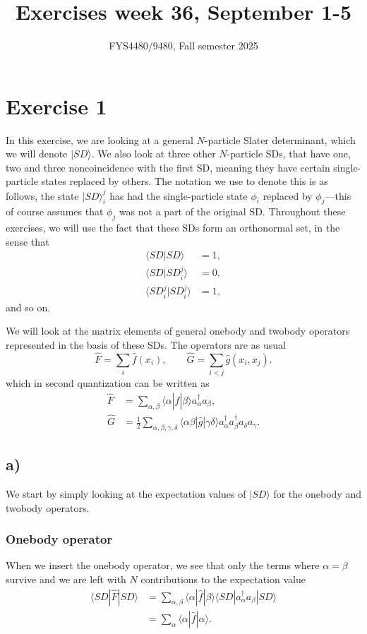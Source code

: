 \documentclass[a4paper, 11pt, notitlepage, english]{article}
\title{Exercises week 36, September 1-5}
\author{FYS4480/9480, Fall semester 2025}
\newcommand{\ket}[1]{|#1 \rangle}
\newcommand{\braket}[2]{\langle #1 | #2 \rangle}
\newcommand{\op}[1]{\hat{#1}}
\newcommand{\braopket}[3]{\langle #1 | {#2} | #3 \rangle}
\begin{document}
\maketitle

\section*{Exercise 1}
In this exercise, we are looking at a general $N$-particle Slater determinant, which we will denote $\ket{SD}$. We also look at three other $N$-particle SDs, that have one, two and three non\-coincidence with the first SD, meaning they have certain single-particle states replaced by others. The notation we use to denote this is as follows, the state $\ket{SD}_i^j$ has had the single-particle state $\phi_i$ replaced by $\phi_j$---this of course assumes that $\phi_j$ was not a part of the original SD. Throughout these exercises, we will use the fact that these SDs form an orthonormal set, in the sense that
\begin{align*}
\braket{SD}{SD} &= 1, \\
\braket{SD}{SD_i^j} &= 0, \\
\braket{SD_i^j}{SD_i^j} &= 1,
\end{align*}
and so on.

We will look at the matrix elements of general onebody and twobody operators represented in the basis of these SDs. The operators are as usual
$$\op{F} = \sum_i \op{f}(x_i), \qquad \op{G}=\sum_{i<j}\op{g}(x_i,x_j).$$
which in second quantization can be written as
\begin{align*}
\op{F} &= \sum_{\alpha, \beta} \braopket{\alpha}{\op{f}}{\beta}a_\alpha^\dag a_\beta, \\
\op{G} &= \frac{1}{2}\sum_{\alpha, \beta, \gamma, \delta} \braopket{\alpha\beta}{\op{g}}{\gamma\delta}a_\alpha^\dag a_\beta^\dag a_\delta a_\gamma.
\end{align*}

\clearpage

\subsection*{a)}
We start by simply looking at the expectation values of $\ket{SD}$ for the onebody and twobody operators.

\subsubsection*{Onebody operator}
When we insert the onebody operator, we see that only the terms where $\alpha=\beta$ survive and we are left with $N$ contributions to the expectation value
\begin{align*}
\braopket{SD}{\op{F}}{SD} 
&= \sum_{\alpha, \beta} \braopket{\alpha}{\op{f}}{\beta}\braopket{SD}{a_\alpha^\dag a_\beta}{SD} \\&= \sum_\alpha \braopket{\alpha}{\op{f}}{\alpha}.		
\end{align*}
\end{document}

